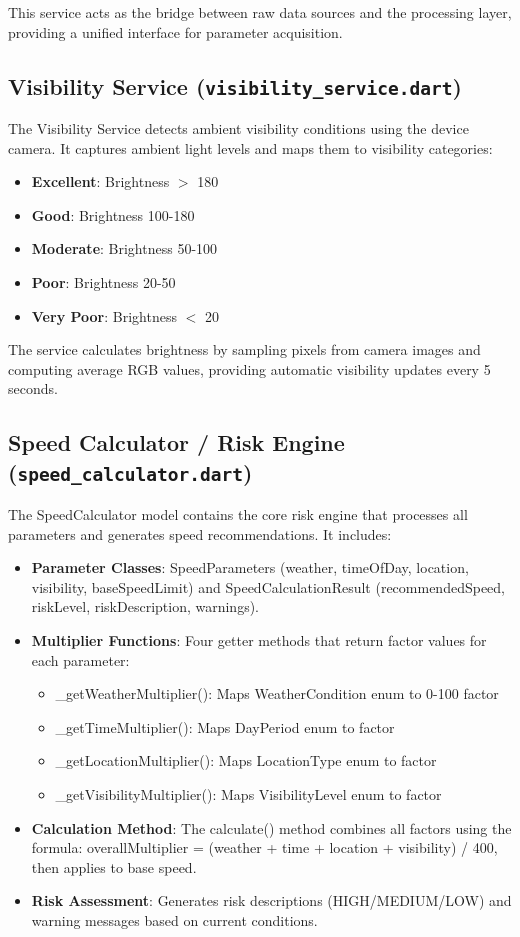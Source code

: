 This service acts as the bridge between raw data sources and the processing layer, providing a unified interface for parameter acquisition.

\subsection{Visibility Service (\texttt{visibility\_service.dart})}
The Visibility Service detects ambient visibility conditions using the device camera. It captures ambient light levels and maps them to visibility categories:
\begin{itemize}
    \item \textbf{Excellent}: Brightness $>$ 180
    \item \textbf{Good}: Brightness 100-180
    \item \textbf{Moderate}: Brightness 50-100
    \item \textbf{Poor}: Brightness 20-50
    \item \textbf{Very Poor}: Brightness $<$ 20
\end{itemize}

The service calculates brightness by sampling pixels from camera images and computing average RGB values, providing automatic visibility updates every 5 seconds.

\subsection{Speed Calculator / Risk Engine (\texttt{speed\_calculator.dart})}
The SpeedCalculator model contains the core risk engine that processes all parameters and generates speed recommendations. It includes:

\begin{itemize}
    \item \textbf{Parameter Classes}: SpeedParameters (weather, timeOfDay, location, visibility, baseSpeedLimit) and SpeedCalculationResult (recommendedSpeed, riskLevel, riskDescription, warnings).
    \item \textbf{Multiplier Functions}: Four getter methods that return factor values for each parameter:
        \begin{itemize}
            \item \_getWeatherMultiplier(): Maps WeatherCondition enum to 0-100 factor
            \item \_getTimeMultiplier(): Maps DayPeriod enum to factor
            \item \_getLocationMultiplier(): Maps LocationType enum to factor
            \item \_getVisibilityMultiplier(): Maps VisibilityLevel enum to factor
        \end{itemize}
    \item \textbf{Calculation Method}: The calculate() method combines all factors using the formula: overallMultiplier = (weather + time + location + visibility) / 400, then applies to base speed.
    \item \textbf{Risk Assessment}: Generates risk descriptions (HIGH/MEDIUM/LOW) and warning messages based on current conditions.
\end{itemize}

